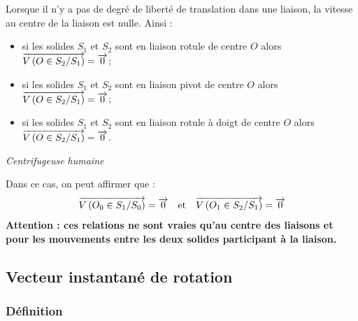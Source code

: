 \documentclass[10pt,oneside]{article}
\begin{document}
\begin{resultat}
Lorsque il n'y a pas de degré de liberté de translation dans une liaison, la vitesse au centre de la liaison est nulle. Ainsi : 
\begin{itemize}
\item si les solides $S_1$ et $S_2$ sont en liaison rotule de centre $O$ alors $\overrightarrow{V\left( {O} \in {S_2}/{S_1}\right)}=\overrightarrow{0}$;
\item si les solides $S_1$ et $S_2$ sont en liaison pivot de centre $O$ alors $\overrightarrow{V\left( {O} \in {S_2}/{S_1}\right)}=\overrightarrow{0}$;
\item si les solides $S_1$ et $S_2$ sont en liaison rotule à doigt de centre $O$ alors $\overrightarrow{V\left( {O} \in {S_2}/{S_1}\right)}=\overrightarrow{0}$.
\end{itemize}
\end{resultat}
\begin{exemple}
\textit{Centrifugeuse humaine}

Dans ce cas, on peut affirmer que :
$$
 \overrightarrow{V\left( {O_0} \in {S_1}/{S_0}\right)} = \overrightarrow{0} \quad \text{et} \quad 
\overrightarrow{V\left( {O_1} \in {S_2}/{S_1}\right)} = \overrightarrow{0}
$$
\textbf{Attention : ces relations ne sont vraies qu'au centre des liaisons et pour les mouvements entre les deux solides participant à la liaison.} 
\end{exemple}
\subsection{Vecteur instantané de rotation}

\subsubsection{Définition}
\end{document}
